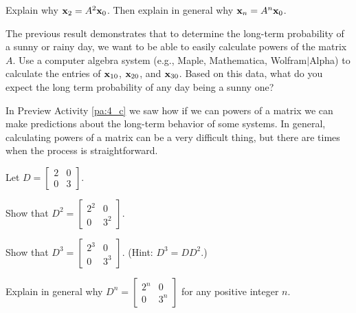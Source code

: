 \begin{pa}
\item  Explain why $\mathbf{x}_2 = A^2 \mathbf{x}_0$. Then explain in general why $\mathbf{x}_n = A^n \mathbf{x}_0$. 

\item The previous result demonstrates that to determine the long-term probability of a sunny or rainy day, we want to be able to easily calculate powers of the matrix $A$. Use a computer algebra system (e.g., Maple, Mathematica, Wolfram$|$Alpha) to calculate the entries of $\mathbf{x}_{10}$, $\mathbf{x}_{20}$, and $\mathbf{x}_{30}$.  Based on this data, what do you expect the long term probability of any day being a sunny one? 

\ee

\end{pa}




In Preview Activity \ref{pa:4_c} we saw how if we can powers of a matrix we can make predictions about the long-term behavior of some systems. In general, calculating powers of a matrix can be a very difficult thing, but there are times when the process is straightforward. 

\begin{activity} \label{act:4_c_0} Let $D = \left[ \begin{array}{cc} 2&0 \\ 0&3 \end{array} \right]$. 
	\ba
	\item Show that $D^2 = \left[ \begin{array}{cc} 2^2&0 \\ 0&3^2 \end{array} \right]$.

	\item Show that $D^3 = \left[ \begin{array}{cc} 2^3&0 \\ 0&3^3 \end{array} \right]$. (Hint: $D^3 = DD^2$.)

	\item Explain in general why $D^n = \left[ \begin{array}{cc} 2^n&0 \\ 0&3^n \end{array} \right]$ for any positive integer $n$.

	\ea
\end{activity}

